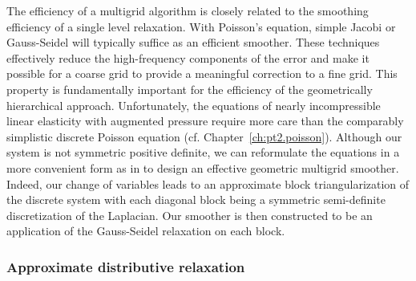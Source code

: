 The efficiency of a multigrid algorithm is closely related to the smoothing efficiency of a single level relaxation. With Poisson's equation, simple Jacobi or Gauss-Seidel will typically suffice as an efficient smoother. These techniques effectively reduce the high-frequency components of the error and make it possible for a coarse grid to provide a meaningful correction to a fine grid. This property is fundamentally important for the efficiency of the geometrically hierarchical approach. Unfortunately, the equations of nearly incompressible linear elasticity with augmented pressure require more care than the comparably simplistic discrete Poisson equation (cf. Chapter~\ref{ch:pt2.poisson}). Although our system is not symmetric positive definite, we can reformulate the equations in a more convenient form as in \cite{Zhu.Yongning10} to design an effective geometric multigrid smoother. Indeed, our change of variables leads to an approximate block triangularization of the discrete system with each diagonal block being a symmetric semi-definite discretization of the Laplacian. Our smoother is then constructed to be an application of the Gauss-Seidel relaxation on each block.

\subsubsection{Approximate distributive relaxation} \label{subsubsec:ch5.multigrid.relaxation.distributive}

